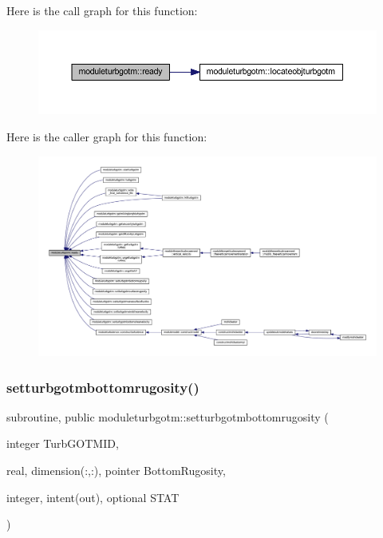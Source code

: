 Here is the call graph for this function\+:\nopagebreak
\begin{figure}[H]
\begin{center}
\leavevmode
\includegraphics[width=350pt]{namespacemoduleturbgotm_a8b59a232d6c61837f14e169cef43d695_cgraph}
\end{center}
\end{figure}
Here is the caller graph for this function\+:\nopagebreak
\begin{figure}[H]
\begin{center}
\leavevmode
\includegraphics[width=350pt]{namespacemoduleturbgotm_a8b59a232d6c61837f14e169cef43d695_icgraph}
\end{center}
\end{figure}
\mbox{\label{namespacemoduleturbgotm_a2596446f2aa54a9db3ed26b9552952d6}} 
\subsubsection{\texorpdfstring{setturbgotmbottomrugosity()}{setturbgotmbottomrugosity()}}
{\footnotesize\ttfamily subroutine, public moduleturbgotm\+::setturbgotmbottomrugosity (\begin{DoxyParamCaption}\item[{integer}]{Turb\+G\+O\+T\+M\+ID,  }\item[{real, dimension(\+:,\+:), pointer}]{Bottom\+Rugosity,  }\item[{integer, intent(out), optional}]{S\+T\+AT }\end{DoxyParamCaption})}

